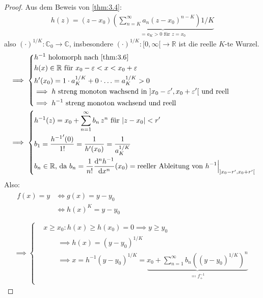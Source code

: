 \documentclass[a4paper,10pt]{scrbook}
\begin{document}
\begin{theorem}[Satz]
\begin{proof}
    Aus dem Beweis von \ref{thm:3.4}:
    \begin{align*}
      h(z) = (z-x_0) \underbrace{\left( \sum\limits_{n=K}^{\infty} a_n (z-x_0)^{n-K} \right){1/K}}_{=a_K > 0 \text{ für } z=x_0}
    \end{align*}
    also $(\cdot)^{1/K} : \mathbb{C}_0 \to \mathbb{C}$, insbesondere $(\cdot)^{1/K} : [0,\infty[ \to \mathbb{R}$ ist die reelle $K$-te Wurzel.
    \begin{align*}
      &\implies
      \begin{dcases}
        h^{-1} \text{ holomorph nach \ref{thm:3.6}} \\
        h(x) \in \mathbb{R} \text{ für } x_0-\varepsilon < x < x_0+\varepsilon \\
        h'(x_0) = 1 \cdot a_K^{1/K} + 0 \cdot \ldots = a_K^{1/K} > 0 \\
        \implies h \text{ streng monoton wachsend in } ]x_0-\varepsilon',x_0+\varepsilon'[ \text{ und reell} \\
        \implies h^{-1} \text{ streng monoton wachsend und reell}
      \end{dcases} \\
      &\implies
      \begin{dcases}
        h^{-1}(z) = x_0 + \sum\limits_{n=1}^{\infty} b_n \, z^n \text{ für } |z-x_0| < r' \\
        b_1 = \frac{{h^{-1}}'(0)}{1!} = \frac{1}{h'(x_0)} = \frac{1}{a_K^{1/K}} \\
        b_n \in \mathbb{R} \text{, da } b_n = \frac{1}{n!} \frac{\mathrm{d}^n h^{-1}}{\mathrm{d}x^n}(x_0) = \text{reeller Ableitung von } h^{-1}\Big|_{]x_0-r',x_0+r'[}
      \end{dcases} \\
    \end{align*}
    Also:
    \begin{gather*}
      \begin{aligned}
        f(x) = y
        &\iff g(x) = y-y_0 \\
        &\iff h(x)^K = y-y_0 \\
      \end{aligned} \\
      \implies
      \left\{
      \begin{aligned}
        &x \geq x_0 : h(x) \geq h(x_0) = 0 \implies y \geq y_0 \\
        &\qquad \implies h(x) = (y-y_0)^{1/K} \\
        &\qquad \implies x = h^{-1} (y-y_0)^{1/K} = \underbrace{x_0 + \sum\limits_{n=1}^{\infty} b_n \left( (y-y_0)^{1/K} \right)^n}_{\eqcolon f_{+}^{-1}} \\

\end{aligned}
\end{gather*}
\end{proof}
\end{theorem}
\end{document}
